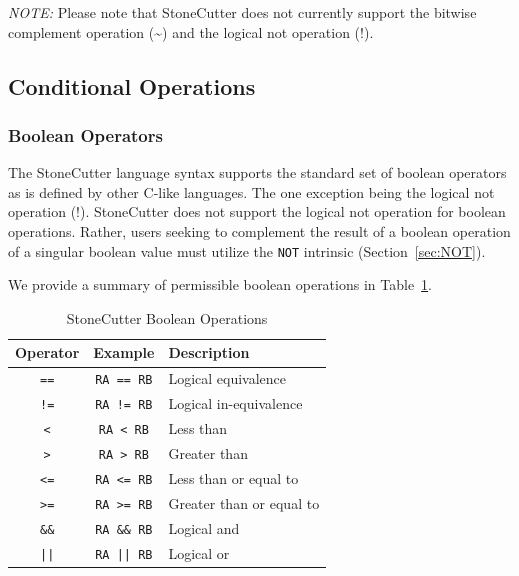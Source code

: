 \documentclass{article}
\begin{document}
\textit{NOTE:} Please note that StoneCutter does not currently support the bitwise complement 
operation (\textasciitilde) and the logical not operation (!).  

\clearpage
\subsection{Conditional Operations}
\label{sec:ConditionalOperations}

\subsubsection{Boolean Operators}
\label{sec:BooleanOperators}

The StoneCutter language syntax supports the standard set of boolean 
operators as is defined by other C-like languages.  The one exception being the 
logical not operation (!).  StoneCutter does not support the logical not operation for 
boolean operations.  Rather, users seeking to complement the result of a boolean operation 
of a singular boolean value must utilize the \texttt{NOT} intrinsic (Section~\ref{sec:NOT}).

We provide a summary of permissible boolean operations in Table~\ref{tab:boolops}.

\begin{table}[h]
\begin{center}
\caption{StoneCutter Boolean Operations}
\vspace{0.125in}
\label{tab:boolops}
\begin{tabular}{|c|c|l|}
\hline
\textbf{Operator} & \textbf{Example} & \textbf{Description}\\
\hline
\texttt{==} & \texttt{RA == RB} & Logical equivalence\\
\hline
\texttt{!=} & \texttt{RA != RB} & Logical in-equivalence\\
\hline
\texttt{<} & \texttt{RA < RB} & Less than\\
\hline
\texttt{>} & \texttt{RA > RB} & Greater than\\
\hline
\texttt{<=} & \texttt{RA <= RB} & Less than or equal to\\
\hline
\texttt{>=} & \texttt{RA >= RB} & Greater than or equal to\\
\hline
\texttt{\&\&} & \texttt{RA \&\& RB} & Logical and\\
\hline
\texttt{||} & \texttt{RA || RB} & Logical or\\
\hline
\end{tabular}
\end{center}
\end{table}
\end{document}
